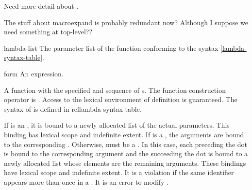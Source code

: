 \label{function}
%
\begin{optPrivate}
    Need more detail about .

    The stuff about macroexpand is probably redundant now?  Although I
    suppose we need something at top-level??
\end{optPrivate}
%
\begin{optDefinition}
%
%
\Syntax
\label{lambda-syntax-table}
%
%
\begin{arguments}
    \item[lambda-list] The parameter list of the function conforming to the
    syntax \ref{lambda-syntax-table}.
    \item[form] An expression.
\end{arguments}
%
\result%
A function with the specified  and sequence of s.
%
\remarks%
The function construction operator is .  Access to the lexical
environment of definition is guaranteed.  The syntax of  is
defined in ref{lambda-syntax-table}.

If  is an , it is bound to a newly
allocated list of the actual parameters.  This binding  has lexical scope and indefinite
extent.  If  is a , the arguments are
bound to the corresponding .  Otherwise, 
must be a .  In this case, each  preceding the
dot is bound to the corresponding argument and the  succeeding
the dot is bound to a newly allocated list whose elements are the remaining
arguments.  These bindings have lexical scope and indefinite extent.  It is a
violation if the same identifier appears more than once in a
.  It is an error to modify .


\end{optDefinition}
